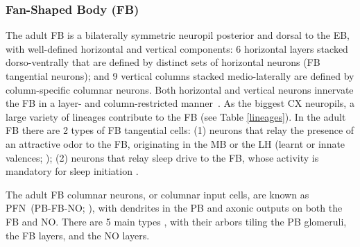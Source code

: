         \subsubsection{Fan-Shaped Body (FB)}
        The adult FB is a bilaterally symmetric neuropil posterior and dorsal to the EB, with well-defined horizontal and vertical components: 6 horizontal layers stacked dorso-ventrally that are defined by distinct sets of horizontal neurons (FB tangential neurons); and 9 vertical columns stacked medio-laterally are defined by column-specific columnar neurons.
        Both horizontal and vertical neurons innervate the FB in a layer- and column-restricted manner~\citep{heinze2017unraveling}.
        As the biggest CX neuropils, a large variety of lineages contribute to the FB (see Table \ref{lineages}).
        In the adult FB there are 2 types of FB tangential cells: (1) neurons that relay the presence of an attractive odor to the FB, originating in the MB or the LH (learnt or innate valences; \citep{hulse2021connectome}); (2) neurons that relay sleep drive to the FB, whose activity is mandatory for sleep initiation \citep{ShaferKeene2021sleep}. 
        
        
        The adult FB columnar neurons, or columnar input cells, are known as PFN~(PB-FB-NO; \citep{wolff2018neuroarchitecture}), with dendrites in the PB and axonic outputs on both the FB and NO.
        There are 5 main types \citep{hulse2021connectome}, with their arbors tiling the PB glomeruli, the FB layers, and the NO layers.

